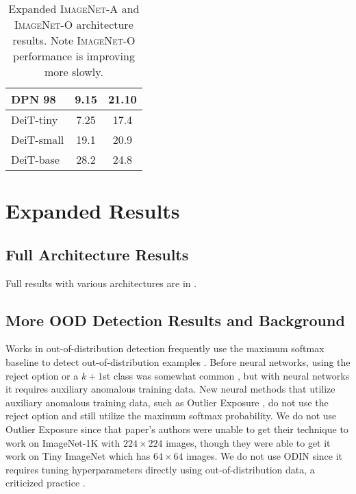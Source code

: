 \documentclass[10pt,twocolumn,letterpaper]{article}
\begin{document}
\begin{table*}[t]
\begin{center}
\begin{tabular}{lcc}
DPN 98                  & 9.15  & 21.10     \\
\hline
DeiT-tiny        & 7.25 & 17.4 \\
DeiT-small        & 19.1 & 20.9 \\
DeiT-base        & 28.2 & 24.8 \\
\hline
\end{tabular}
\end{center}
\caption{Expanded \textsc{ImageNet-A} and \textsc{ImageNet-O} architecture results. Note \textsc{ImageNet-O} performance is improving more slowly.}\label{tab:fullarch}
\vspace{-10pt}
\end{table*}

\section{Expanded Results}


\subsection{Full Architecture Results}
Full results with various architectures are in .

\subsection{More OOD Detection Results and Background}

Works in out-of-distribution detection frequently use the maximum softmax baseline to detect out-of-distribution examples \cite{hendrycks17baseline}. Before neural networks, using the reject option or a $k+1$st class was somewhat common \cite{Bartlett2008ClassificationWA}, but with neural networks it requires auxiliary anomalous training data. New neural methods that utilize auxiliary anomalous training data, such as Outlier Exposure \cite{hendrycks2019oe}, do not use the reject option and still utilize the maximum softmax probability. We do not use Outlier Exposure since that paper's authors were unable to get their technique to work on ImageNet-1K with $224\times224$ images, though they were able to get it work on Tiny ImageNet which has $64\times64$ images. We do not use ODIN since it requires tuning hyperparameters directly using out-of-distribution data, a criticized practice \cite{hendrycks2019oe}.
\end{document}
